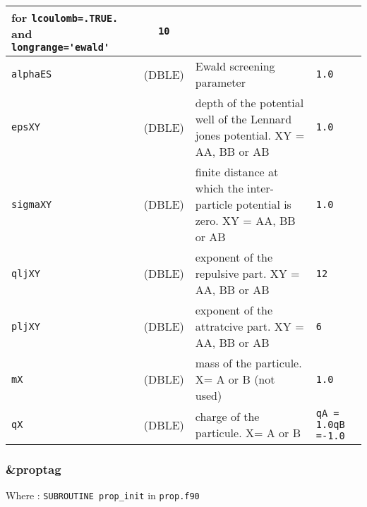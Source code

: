 \documentclass[a4paper]{article}
\begin{document}
\begin{longtable}{l|c|m{8cm}|m{2cm}}
					 for \verb?lcoulomb=.TRUE.? and \verb?longrange='ewald'?  \newline                   & \verb?10? \\
\hline
\rule[-0.75cm]{0cm}{1.5cm}
\verb?alphaES?     &  (DBLE)            & Ewald screening parameter                                                          & \verb?1.0? \\
\hline
\rule[-0.75cm]{0cm}{1.5cm}
\verb?epsXY?       &  (DBLE)            & depth of the potential well of the Lennard jones potential. XY = AA, BB or AB      & \verb?1.0? \\
\hline
\rule[-0.75cm]{0cm}{1.5cm}
\verb?sigmaXY?     &  (DBLE)            & finite distance at which the inter-particle potential is zero. XY = AA, BB or AB   & \verb?1.0? \\
\hline
\rule[-0.75cm]{0cm}{1.5cm}
\verb?qljXY?       &  (DBLE)            & exponent of the repulsive part. XY = AA, BB or AB                                  & \verb?12? \\
\hline
\rule[-0.75cm]{0cm}{1.5cm}
\verb?pljXY?       &  (DBLE)            & exponent of the attratcive part. XY = AA, BB or AB                                 & \verb?6? \\
\hline
\rule[-0.75cm]{0cm}{1.5cm}
\verb?mX?          &  (DBLE)            & mass of the particule. X= A or B (not used)                                        & \verb?1.0? \\
\hline
\rule[-0.75cm]{0cm}{1.5cm}
\verb?qX?          &  (DBLE)            & charge of the particule. X= A or B                                                 & \verb?qA = 1.0?\newline\verb?qB =-1.0?\\
\hline
\hline
\end{longtable}

\subsubsection{\&proptag}

Where : \verb?SUBROUTINE prop_init? in \verb?prop.f90?
\newline
\end{document}
